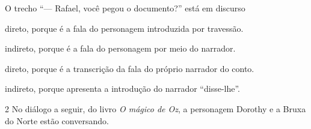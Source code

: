 O trecho ``--- Rafael, você pegou o documento?'' está em discurso

\begin{escolha}
\item direto, porque é a fala do personagem introduzida por travessão.

\item indireto, porque é a fala do personagem por meio do narrador.

\item direto, porque é a transcrição da fala do próprio narrador do conto.

\item indireto, porque apresenta a introdução do narrador ``disse-lhe''.
\end{escolha}

\num{2} No diálogo a seguir, do livro \textit{O mágico de Oz}, a personagem
Dorothy e a Bruxa do Norte estão conversando.

